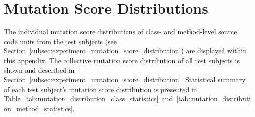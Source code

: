 \appendix
\chapter{Mutation Score Distributions}
\label{app:mutation_score_distributions}
The individual mutation score distributions of class- and method-level source code units from the test subjects (see Section~\ref{subsec:experiment_mutation_score_distribution}) are displayed within this appendix. The collective mutation score distribution of all test subjects is shown and described in Section~\ref{subsec:experiment_mutation_score_distribution}. Statistical summary of each test subject's mutation score distribution is presented in Table~\ref{tab:mutation_distribution_class_statistics}~and~\ref{tab:mutation_distribution_method_statistics}.

